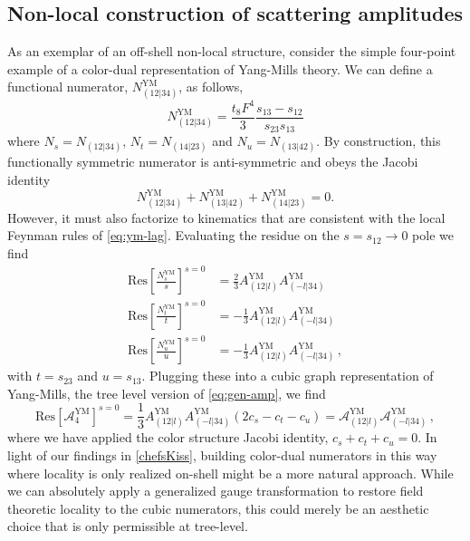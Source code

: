 \documentclass[11pt,letter]{article}
\begin{document}
\subsection{Non-local construction of scattering amplitudes}
\label{nonLocalScattering}
As an exemplar of an off-shell non-local structure, consider the simple four-point example of a color-dual
representation of Yang-Mills theory. We can define a functional numerator, $N_{(12|34)}^{\text{YM}}$, as follows, 
\begin{equation}
N_{(12|34)}^{\text{YM}} = \frac{t_8F^4}{3} \frac{s_{13}-s_{12}}{s_{23}{s_{13}}}
\end{equation}
where $N_s = N_{(12|34)}$, $N_t = N_{(14|23)}$ and $N_u = N_{(13|42)}$. By construction, this functionally symmetric numerator is
anti-symmetric and obeys the Jacobi identity
\begin{equation}\label{nonLocalNum}
N_{(12|34)}^{\text{YM}} + N_{(13|42)}^{\text{YM}} +N_{(14|23)}^{\text{YM}} = 0.
\end{equation}
However, it must also factorize to kinematics that are consistent with
the local Feynman rules of \cref{eq:ym-lag}. Evaluating the residue on
the $s=s_{12} \to 0$ pole we find
\begin{align}
\text{Res}\left[\frac{ N_{s}^{\text{YM}} }{s}\right]^{s=0}&= \frac{2}{3}A_{(12|l)}^{\text{YM}}A_{(-l|34)}^{\text{YM}} 
\\
\text{Res}\left[\frac{N_{t}^{\text{YM}} }{t}\right]^{s=0}&= -\frac{1}{3}A_{(12|l)}^{\text{YM}}A_{(-l|34)}^{\text{YM}} 
\\
\text{Res}\left[\frac{N_{u}^{\text{YM}} }{u}\right]^{s=0}&= -\frac{1}{3} A_{(12|l)}^{\text{YM}}A_{(-l|34)}^{\text{YM}} \, ,
\end{align}
with $t=s_{23}$ and $u=s_{13}$.
Plugging these into a cubic graph representation of Yang-Mills, the
tree level version of \cref{eq:gen-amp}, we find
\begin{equation}
  \text{Res}\left[\mathcal{A}_4^{\text{YM}}\right]^{s=0}
  = \frac{1}{3} A_{(12|l)}^{\text{YM}}A_{(-l|34)}^{\text{YM}} (2c_s-c_t-c_u)
  =  \mathcal{A}_{(12|l)}^{\text{YM}}\mathcal{A}_{(-l|34)}^{\text{YM}} \, ,
\end{equation}
where we have applied the color structure Jacobi identity,
$c_s+c_t+c_u=0$. In light of our findings in \cref{chefsKiss}, building color-dual numerators in this way where locality is only realized on-shell might be a more natural approach. While we can absolutely apply a generalized gauge
transformation \cite{BCJ} to restore field theoretic locality to the
cubic numerators, this could merely be an aesthetic choice that is only permissible at tree-level.
\end{document}
